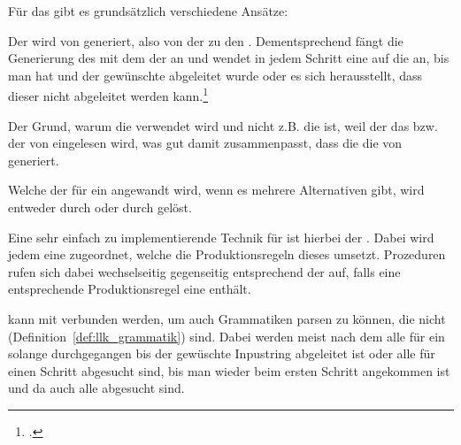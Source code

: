 \begin{Special_Paragraph}
Für das  gibt es grundsätzlich  verschiedene Ansätze:

\begin{itemize}[itemsep=-1mm, topsep=-1mm]
   Der  wird von  generiert, also von der  zu den . Dementsprechend fängt die Generierung des  mit dem  der  an und wendet in jedem Schritt eine  auf die  an, bis man  hat und der gewünschte  abgeleitet wurde oder es sich herausstellt, dass dieser nicht abgeleitet werden kann.\footcite{noauthor_what_nodate-2}

  Der Grund, warum die  verwendet wird und nicht z.B. die  ist, weil der das  bzw. der  von  eingelesen wird, was gut damit zusammenpasst, dass die  die  von  generiert.

  Welche der  für ein  angewandt wird, wenn es mehrere Alternativen gibt, wird entweder durch  oder durch  gelöst.

  Eine sehr einfach zu implementierende Technik für  ist hierbei der . Dabei wird jedem  eine  zugeordnet, welche die Produktionsregeln dieses  umsetzt. Prozeduren rufen sich dabei wechselseitig gegenseitig entsprechend der  auf, falls eine entsprechende Produktionsregel eine  enthält.

   kann mit  verbunden werden, um auch Grammatiken parsen zu können, die nicht  (Definition~\ref{def:llk_grammatik}) sind. Dabei werden meist nach dem  alle  für ein  solange durchgegangen bis der gewüschte Inpustring abgeleitet ist oder alle  für einen Schritt abgesucht sind, bis man wieder beim ersten Schritt angekommen ist und da auch alle  abgesucht sind.


\end{itemize}
\end{Special_Paragraph}
